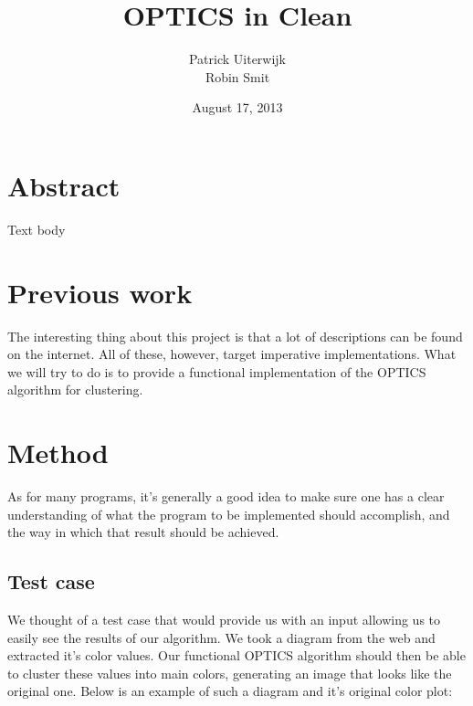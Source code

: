 \documentclass[12pt,a4paper]{article}
\title{OPTICS in Clean}
\date{August 17, 2013}
\author{Patrick Uiterwijk\\Robin Smit}
\begin{document}
\maketitle
\clearpage

\tableofcontents
\clearpage

\section{Abstract}
Text body

\section{Previous work}
The interesting thing about this project is that a lot of descriptions can be found on the internet. All of these, however, target imperative implementations. What we will try to do is to provide a functional implementation of the OPTICS algorithm for clustering.

\section{Method}
As for many programs, it's generally a good idea to make sure one has a clear understanding of what the program to be implemented should accomplish, and the way in which that result should be achieved.

\subsection{Test case}
We thought of a test case that would provide us with an input allowing us to easily see the results of our algorithm. We took a diagram from the web and extracted it's color values. Our functional OPTICS algorithm should then be able to cluster these values into main colors, generating an image that looks like the original one. Below is an example of such a diagram and it's original color plot:
\end{document}
